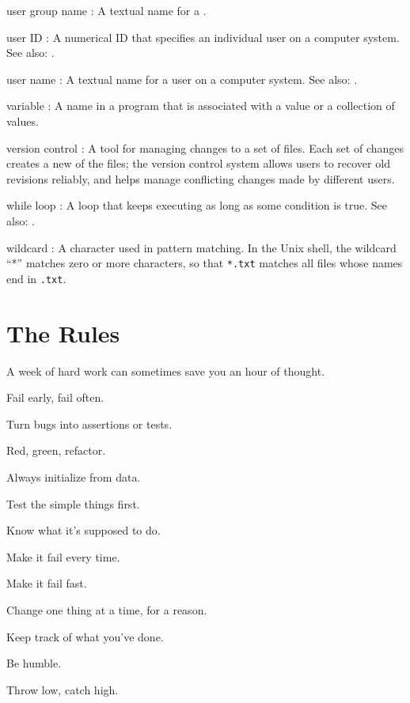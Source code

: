 \documentclass{book}
\begin{document}
\begin{swcdescription}
\item[user group name]:
A textual name for a .
 
\item[user ID]:
A numerical ID that specifies an individual user on a computer system.
See also: .
 
\item[user name]:
A textual name for a user on a computer system.
See also: .

\item[variable]:
A name in a program that is associated with a value
or a collection of values.

\item[version control]:
A tool for managing changes to a set of files.
Each set of changes creates a new  of the
files; the version control system allows users to recover old revisions
reliably, and helps manage conflicting changes made by different users.
 
\item[while loop]:
A loop that keeps executing as long as some condition is true.
See also: .

\item[wildcard]:
A character used in pattern matching. In the Unix
shell, the wildcard ``*'' matches zero or more characters, so that
\texttt{*.txt} matches all files whose names end in \texttt{.txt}.

\end{swcdescription}

\chapter{The Rules}\label{s:rules}

\begin{swcitemize}
\item
  A week of hard work can sometimes save you an hour of thought.
\item
  Fail early, fail often.
\item
  Turn bugs into assertions or tests.
\item
  Red, green, refactor.
\item
  Always initialize from data.
\item
  Test the simple things first.
\item
  Know what it's supposed to do.
\item
  Make it fail every time.
\item
  Make it fail fast.
\item
  Change one thing at a time, for a reason.
\item
  Keep track of what you've done.
\item
  Be humble.
\item
  Throw low, catch high.
\end{swcitemize}
\end{document}
